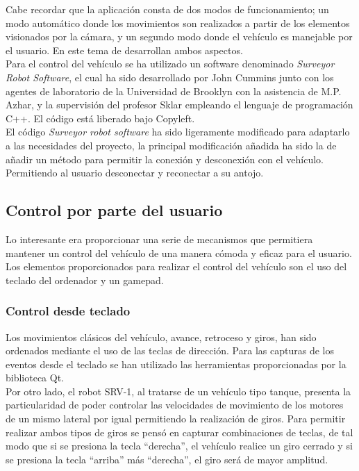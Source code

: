 \documentclass[a4paper,12pt]{article}
\begin{document}
Cabe recordar que la aplicación consta de dos modos de funcionamiento; un modo automático donde los movimientos son realizados a partir de los elementos visionados por la cámara, y un segundo modo donde el vehículo es manejable por el usuario. En este tema de desarrollan ambos aspectos.\\

Para el control del vehículo se ha utilizado un software denominado \emph{Surveyor Robot Software}, el cual ha sido desarrollado por John Cummins junto con los agentes de laboratorio de la Universidad de Brooklyn con la asistencia de M.P. Azhar, y la supervisión del profesor Sklar empleando el lenguaje de programación C++. El código está liberado bajo Copyleft.\\

El código \emph{Surveyor robot software} ha sido ligeramente modificado para adaptarlo a las necesidades del proyecto, la principal modificación añadida ha sido la de añadir un método para permitir la conexión y desconexión con el vehículo. Permitiendo al usuario desconectar y reconectar a su antojo.

\subsection{Control por parte del usuario}

Lo interesante era proporcionar una serie de mecanismos que permitiera mantener un control del vehículo de una manera cómoda y eficaz para el usuario. Los elementos proporcionados para realizar el control del vehículo son el uso del teclado del ordenador y un gamepad.

\subsubsection{Control desde teclado}

Los movimientos clásicos del vehículo, avance, retroceso y giros, han sido ordenados mediante el uso de las teclas de dirección. Para las capturas de los eventos desde el teclado se han utilizado las herramientas proporcionadas por la biblioteca Qt.\\

Por otro lado, el robot SRV-1, al tratarse de un vehículo tipo tanque, presenta la particularidad de poder controlar las velocidades de movimiento de los motores de un mismo lateral por igual permitiendo la realización de giros. Para permitir realizar ambos tipos de giros se pensó en capturar combinaciones de teclas, de tal modo que si se presiona la tecla ``derecha'', el vehículo realice un giro cerrado y si se presiona la tecla ``arriba'' más ``derecha'', el giro será de mayor amplitud.\\
\end{document}
